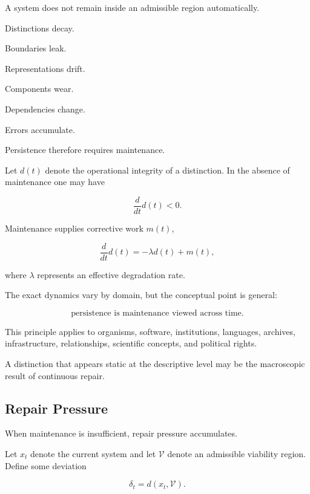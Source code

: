\documentclass[11pt]{article}
\theoremstyle{remark}
\begin{document}
A system does not remain inside an admissible region automatically.

Distinctions decay.

Boundaries leak.

Representations drift.

Components wear.

Dependencies change.

Errors accumulate.

Persistence therefore requires maintenance.

Let $d(t)$ denote the operational integrity of a distinction. In the absence of maintenance one may have

\begin{equation}
\frac{d}{dt}d(t)<0.
\end{equation}

Maintenance supplies corrective work $m(t)$,

\begin{equation}
\frac{d}{dt}d(t)
=
-\lambda d(t)+m(t),
\end{equation}

where $\lambda$ represents an effective degradation rate.

The exact dynamics vary by domain, but the conceptual point is general:

\begin{equation}
\boxed{
\text{persistence is maintenance viewed across time}.
}
\end{equation}

This principle applies to organisms, software, institutions, languages, archives, infrastructure, relationships, scientific concepts, and political rights.

A distinction that appears static at the descriptive level may be the macroscopic result of continuous repair.

\subsection{Repair Pressure}

When maintenance is insufficient, repair pressure accumulates.

Let $x_t$ denote the current system and let $\mathcal{V}$ denote an admissible viability region. Define some deviation

\begin{equation}
\delta_t
=
d(x_t,\mathcal{V}).
\end{equation}
\end{document}
